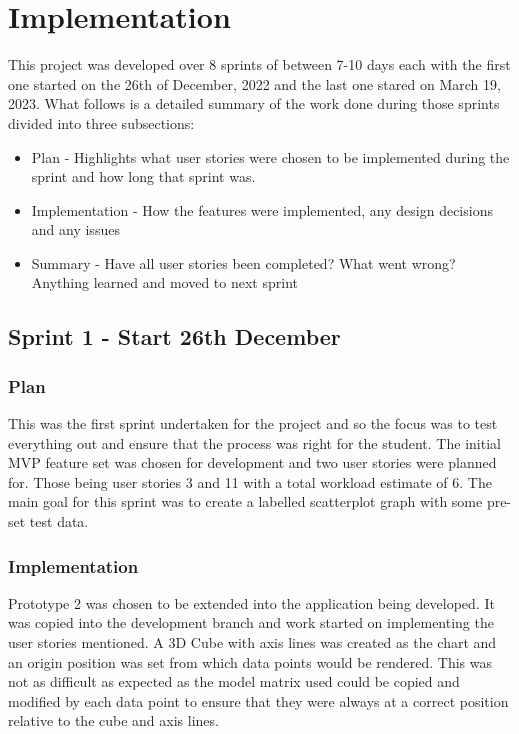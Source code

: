 \section{Implementation}
This project was developed over 8 sprints of between 7-10 days each with the first one started on the 26th of December, 2022 and the last one stared on March 19, 2023. What follows is a detailed summary of the work done during those sprints divided into three subsections:
\begin{itemize}
    \item Plan - Highlights what user stories were chosen to be implemented during the sprint and how long that sprint was.
    \item Implementation - How the features were implemented, any design decisions and any issues
    \item Summary - Have all user stories been completed? What went wrong? Anything learned and moved to next sprint
\end{itemize}

\subsection{Sprint 1 - Start 26th December}

\subsubsection{Plan}
This was the first sprint undertaken for the project and so the focus was to test everything out and ensure that the process was right for the student. The initial MVP feature set was chosen for development and two user stories were planned for. Those being user stories 3 and 11 with a total workload estimate of 6.
The main goal for this sprint was to create a labelled scatterplot graph with some pre-set test data.

\subsubsection{Implementation}
Prototype 2 was chosen to be extended into the application being developed. It was copied into the development branch and work started on implementing the user stories mentioned. A 3D Cube with axis lines was created as the chart and an origin position was set from which data points would be rendered. This was not as difficult as expected as the model matrix used could be copied and modified by each data point to ensure that they were always at a correct position relative to the cube and axis lines.


